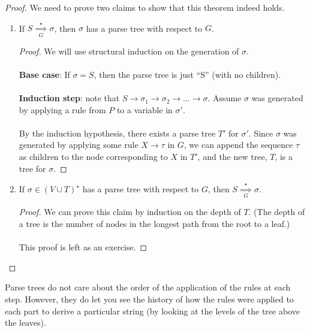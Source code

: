 \documentclass[]{article}
\theoremstyle{definition}
\newcommand{\lecture}[1]{\marginpar{{\footnotesize $\leftarrow$ \underline{#1}}}}
\begin{document}
      \begin{proof}
        We need to prove two claims to show that this theorem indeed holds.
        \begin{enumerate}
          \item If $S \underset{G}{\overset{\star}{\implies}} \sigma$, then $\sigma$ has a parse tree with respect to $G$.

          \begin{proof}
            We will use structural induction on the generation of $\sigma$.
            \\ \\
            \textbf{Base case}: If $\sigma = S$, then the parse tree is just ``S'' (with no children).
            \\ \\
            \textbf{Induction step}: note that $S \to \sigma_1 \to \sigma_2 \to \ldots \to \sigma$. Assume $\sigma$ was generated by applying a rule from $P$ to a variable in $\sigma'$.
            \\ \\
            By the induction hypothesis, there exists a parse tree $T'$ for $\sigma'$. Since $\sigma$ was generated by applying some rule $X \to \tau$ in $G$, we can append the sequence $\tau$ as children to the node corresponding to $X$ in $T'$, and the new tree, $T$, is a tree for $\sigma$.
          \end{proof}

          \item If $\sigma \in (V \cup T)^\star$ has a parse tree with respect to $G$, then $S \underset{G}{\overset{\star}{\implies}} \sigma$.

          \begin{proof}
            We can prove this claim by induction on the depth of $T$. (The depth of a tree is the number of nodes in the longest path from the root to a leaf.)
            \\ \\
            This proof is left as an exercise.
          \end{proof}
        \end{enumerate}
      \end{proof}

      \lecture{October 17, 2013}
      Parse trees do not care about the order of the application of the rules at each step. However, they do let you see the history of how the rules were applied to each part to derive a particular string (by looking at the levels of the tree above the leaves).
\end{document}
